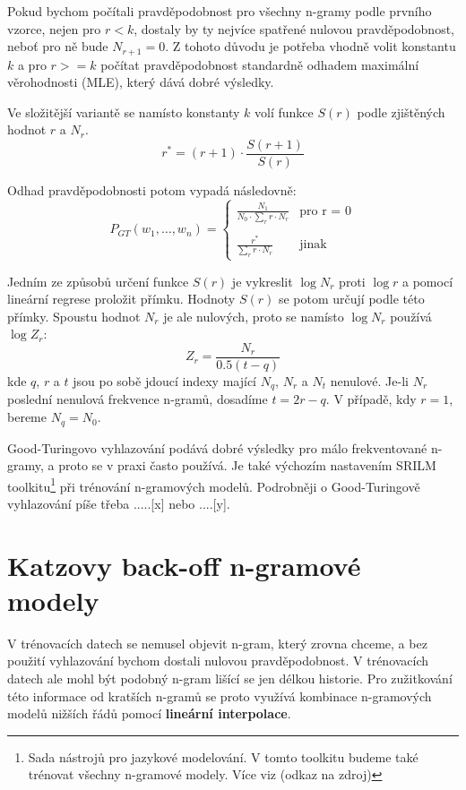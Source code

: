 \documentclass[12pt,a4paper]{report}
\begin{document}
Pokud bychom počítali pravděpodobnost pro všechny n-gramy podle prvního vzorce, nejen pro $r < k$, dostaly by ty nejvíce spatřené nulovou pravděpodobnost, neboť pro ně bude $N_{r+1} = 0$. Z tohoto důvodu je potřeba vhodně volit konstantu $k$ a pro $r >= k$ počítat pravděpodobnost standardně odhadem maximální věrohodnosti (MLE), který dává dobré výsledky.

Ve složitější variantě se namísto konstanty $k$ volí funkce $S(r)$ podle zjištěných hodnot $r$ a $N_r$.
\begin{equation}\label{eq:gtr2}
r^* = (r+1) \cdot \frac {S(r+1)}{S(r)}
\end{equation}

Odhad pravděpodobnosti potom vypadá následovně:
\begin{equation}
P_{GT}(w_{1},\ldots,w_{n}) = \left\{
\begin{array}{ll}
\displaystyle \frac{N_1}{N_0 \cdot \sum_{r}r\cdot N_r} & \text{pro r = 0} \\
&\\
\displaystyle \frac{r^*}{\sum_{r}r\cdot N_r} & \text{jinak} 
\end{array}\right.
\end{equation}

Jedním ze způsobů určení funkce $S(r)$ je vykreslit $\log N_r$ proti $\log r$ a pomocí lineární regrese proložit přímku. Hodnoty $S(r)$ se potom určují podle této přímky. Spoustu hodnot $N_r$ je ale nulových, proto se namísto $\log N_r$ používá $\log Z_r$:
\begin{equation}
Z_r = \frac{N_r}{0.5(t-q)}
\end{equation}
kde $q$, $r$ a $t$ jsou po sobě jdoucí indexy mající $N_q$, $N_r$ a $N_t$ nenulové. Je-li $N_r$ poslední nenulová frekvence n-gramů, dosadíme $t = 2r - q$. V případě, kdy $r = 1$, bereme $N_q = N_0$.

Good-Turingovo vyhlazování podává dobré výsledky pro málo frekventované n-gramy, a proto se v praxi často používá. Je také výchozím nastavením SRILM toolkitu\footnote{Sada nástrojů pro jazykové modelování. V tomto toolkitu budeme také trénovat všechny n-gramové modely. Více viz (odkaz na zdroj)} při trénování n-gramových modelů. Podrobněji o Good-Turingově vyhlazování píše třeba .....[x] nebo ....[y].

\section{Katzovy back-off n-gramové modely}
V trénovacích datech se nemusel objevit n-gram, který zrovna chceme, a bez použití vyhlazování bychom dostali nulovou pravděpodobnost. V trénovacích datech ale mohl být podobný n-gram lišící se jen délkou historie. Pro zužitkování této informace od kratších n-gramů se proto využívá kombinace n-gramových modelů nižších řádů pomocí \textbf{lineární interpolace}. 
\end{document}
